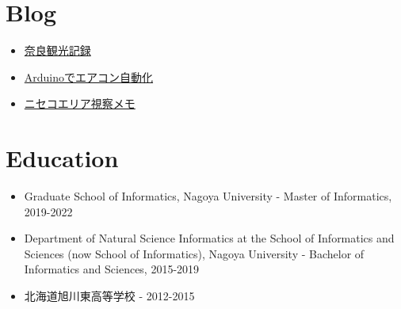\documentclass[11pt]{article}
\begin{document}
\section*{Blog}
\label{sec:orge10e4d4}
\begin{itemize}
\item \href{./nara20220112.html}{奈良観光記録}
\item \href{./arduino.html}{Arduinoでエアコン自動化}
\item \href{./niseko-note.html}{ニセコエリア視察メモ}
\end{itemize}

\section*{Education}
\label{sec:org3968020}
\begin{itemize}
\item Graduate School of Informatics, Nagoya University - Master of Informatics, 2019-2022

\item Department of Natural Science Informatics at the School of Informatics and Sciences (now School of Informatics), Nagoya University - Bachelor of Informatics and Sciences, 2015-2019

\item 北海道旭川東高等学校 - 2012-2015
\end{itemize}
\end{document}
